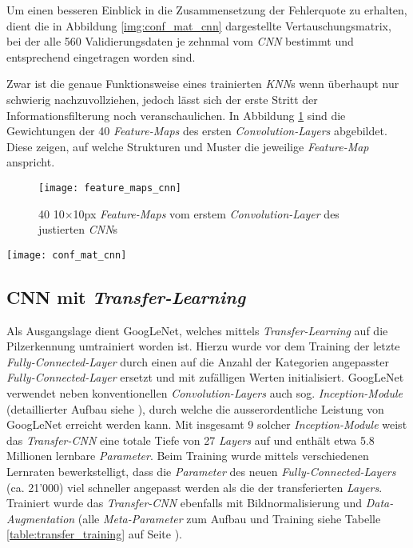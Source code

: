 Um einen besseren Einblick in die Zusammensetzung der Fehlerquote zu erhalten, dient die in Abbildung \ref{img:conf_mat_cnn} dargestellte Vertauschungsmatrix, bei der alle 560 Validierungsdaten je zehnmal vom \textit{CNN} bestimmt und entsprechend eingetragen worden sind.

Zwar ist die genaue Funktionsweise eines trainierten \textit{KNN}s wenn überhaupt nur schwierig nachzuvollziehen, jedoch lässt sich der erste Stritt der Informationsfilterung noch veranschaulichen. In Abbildung \ref{img:feature_maps_cnn} sind die Gewichtungen der 40 \textit{Feature-Maps} des ersten \textit{Convolution-Layers} abgebildet. Diese zeigen, auf welche Strukturen und Muster die jeweilige \textit{Feature-Map} anspricht.

\begin{figure}[h]
	\centering
	\texttt{[image: feature\_maps\_cnn]}
	\caption[\textit{Feature-Maps} vom justierten \textit{CNN}]{40 10$\times$10px \textit{Feature-Maps} vom erstem \textit{Convolution-Layer} des justierten \textit{CNN}s}
	\label{img:feature_maps_cnn}
\end{figure}
\begin{sidewaysfigure}
	\centering
	\texttt{[image: conf\_mat\_cnn]}
	\caption[Vertauschungsmatrix des justierten \textit{CNN}s]{Vertauschungsmatrix des justierten \textit{CNN}s, Validierungsdaten je zehn mal bestimmt: Auf der Diagonalen befinden sich die Anzahl korrekt klassifizierten Validierungsdaten, die restlichen sind falsch bestimmt worden.}
	\label{img:conf_mat_cnn}
\end{sidewaysfigure}


\subsection{CNN mit \textit{Transfer-Learning}}
Als Ausgangslage dient GoogLeNet\cite{googlenet}, welches mittels \textit{Transfer-Learning} auf die Pilzerkennung umtrainiert worden ist. Hierzu wurde vor dem Training der letzte \textit{Fully-Connected-Layer} durch einen auf die Anzahl der Kategorien angepasster \textit{Fully-Connected-Layer} ersetzt und mit zufälligen Werten initialisiert. GoogLeNet verwendet neben konventionellen \textit{Convolution-Layers} auch sog. \textit{Inception-Module} (detaillierter Aufbau siehe \cite{googlenet}), durch welche die ausserordentliche Leistung von GoogLeNet erreicht werden kann. Mit insgesamt 9 solcher \textit{Inception-Module} weist das \textit{Transfer-CNN} eine totale Tiefe von 27 \textit{Layers} auf und enthält etwa 5.8 Millionen lernbare \textit{Parameter}. Beim Training wurde mittels verschiedenen Lernraten bewerkstelligt, dass die \textit{Parameter} des neuen \textit{Fully-Connected-Layers} (ca. 21'000) viel schneller angepasst werden als die der transferierten \textit{Layers}. Trainiert wurde das \textit{Transfer-CNN} ebenfalls mit Bildnormalisierung und \textit{Data-Augmentation} (alle \textit{Meta-Parameter} zum Aufbau und Training siehe Tabelle \ref{table:transfer_training} auf Seite \pageref{table:transfer_training}).

